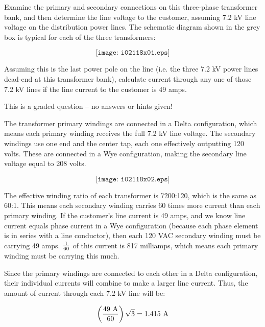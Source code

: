 

Examine the primary and secondary connections on this three-phase transformer bank, and then determine the line voltage to the customer, assuming 7.2 kV line voltage on the distribution power lines.  The schematic diagram shown in the grey box is typical for each of the three transformers:

$$\texttt{[image: i02118x01.eps]}$$

Assuming this is the last power pole on the line (i.e. the three 7.2 kV power lines dead-end at this transformer bank), calculate current through any one of those 7.2 kV lines if the line current to the customer is 49 amps.

\vfil 

\eject






This is a graded question -- no answers or hints given!







The transformer primary windings are connected in a Delta configuration, which means each primary winding receives the full 7.2 kV line voltage.  The secondary windings use one end and the center tap, each one effectively outputting 120 volts.  These are connected in a Wye configuration, making the secondary line voltage equal to 208 volts.

$$\texttt{[image: i02118x02.eps]}$$

The effective winding ratio of each transformer is 7200:120, which is the same as 60:1.  This means each secondary winding carries 60 times more current than each primary winding.  If the customer's line current is 49 amps, and we know line current equals phase current in a Wye configuration (because each phase element is in series with a line conductor), then each 120 VAC secondary winding must be carrying 49 amps.  $1 \over 60$ of this current is 817 milliamps, which means each primary winding must be carrying this much.

Since the primary windings are connected to each other in a Delta configuration, their individual currents will combine to make a larger line current.  Thus, the amount of current through each 7.2 kV line will be:

$$\left( 49 \hbox{ A} \over 60 \right) \sqrt{3} = 1.415 \hbox{ A}$$




